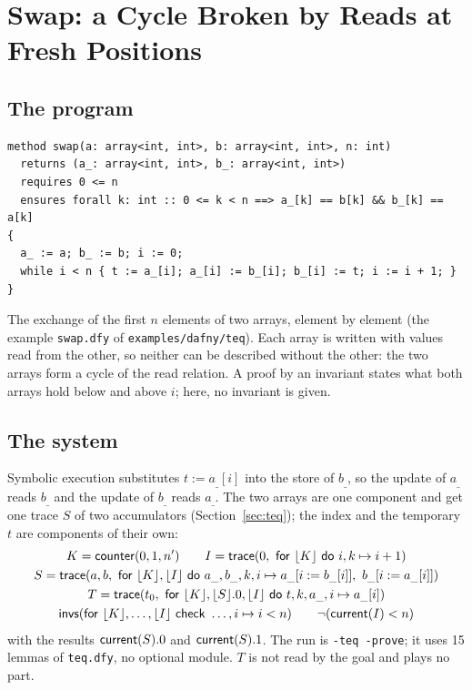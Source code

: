 \section{Swap: a Cycle Broken by Reads at Fresh Positions}\label{sec:swap}

\subsection{The program}
\begin{lstlisting}
method swap(a: array<int, int>, b: array<int, int>, n: int)
  returns (a_: array<int, int>, b_: array<int, int>)
  requires 0 <= n
  ensures forall k: int :: 0 <= k < n ==> a_[k] == b[k] && b_[k] == a[k]
{
  a_ := a; b_ := b; i := 0;
  while i < n { t := a_[i]; a_[i] := b_[i]; b_[i] := t; i := i + 1; }
}
\end{lstlisting}
The exchange of the first $n$ elements of two arrays, element by element (the example \texttt{swap.dfy} of
\texttt{examples/dafny/teq}). Each array is written with values read from the other, so neither can be
described without the other: the two arrays form a cycle of the read relation. A proof by an invariant states what
both arrays hold below and above $i$; here, no invariant is given.

\subsection{The system}
Symbolic execution substitutes $t := a_\_[i]$ into the store of $b_\_$, so the update of $a_\_$ reads $b_\_$ and the
update of $b_\_$ reads $a_\_$. The two arrays are one component and get one trace $S$ of two accumulators
(Section~\ref{sec:teq}); the index and the temporary $t$ are components of their own:
\begin{gather}
  K = \cnt(0, 1, n') \qquad I = \tr{0}{\bl{K}}{i, k \mapsto i + 1} \label{eq:sw0}\\
  S = \mathsf{trace}(a, b,\ \mathsf{for}\ \bl{K}, \bl{I}\ \mathsf{do}\ a_\_, b_\_, k, i \mapsto
      a_\_[i := b_\_[i]],\ b_\_[i := a_\_[i]]) \label{eq:sw1}\\
  T = \tr{t_0}{\bl{K}, \bl{S}.0, \bl{I}}{t, k, a_\_, i \mapsto a_\_[i]} \label{eq:sw2}\\
  \al{\bl{K}, \ldots, \bl{I}}{\ldots, i \mapsto i < n} \qquad \neg(\cur(I) < n) \label{eq:sw3}
\end{gather}
with the results $\mathsf{current}(S).0$ and $\mathsf{current}(S).1$. The run is \texttt{-teq -prove}; it uses 15 lemmas of
\texttt{teq.dfy}, no optional module. $T$ is not read by the goal and plays no part.

